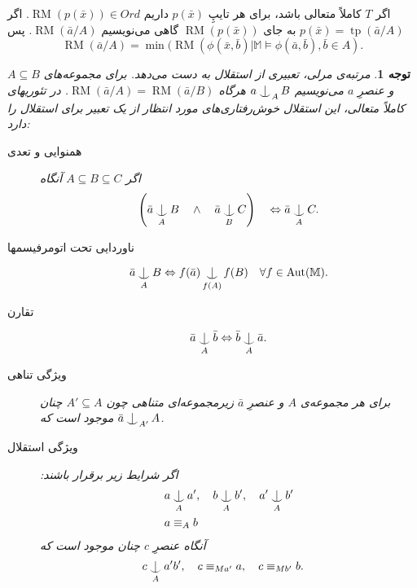 \documentclass[12pt,a4paper]{report}
\def\Ind#1#2{#1\setbox0=\hbox{$#1x$}\kern\wd0\hbox to 0pt{\hss$#1\mid$\hss}
\lower.9\ht0\hbox to 0pt{\hss$#1\smile$\hss}\kern\wd0}
\def\ind{\mathop{\mathpalette\Ind{}}}
\theoremstyle{colorhead}
\newtheorem{tav}[thm]{توجه}
\DeclareMathOperator{\RM}{RM}
\DeclareMathOperator{\tp}{tp}
\DeclareMathOperator{\Aut}{Aut}
\begin{document}
اگر 
$T$
کاملاً متعالی باشد، برای هر تایپِ
$p(\bar{x})$
داریم
$\RM(p(\bar{x}))\in Ord$.
اگر
\mbox{$p(\bar{x})=\tp(\bar{a}/A)$}
به جای
$\RM(p(\bar{x}))$
گاهی می‌نویسیم 
$\RM(\bar{a}/A)$.
پس
\[\RM(\bar{a}/A)=\min (\RM(\phi(\bar{x},\bar{b})|\mathbb{M}\models
\phi(\bar{a},\bar{b}),\bar{b}\in A).\]
\begin{framed}
\begin{tav}
مرتبه‌ی مرلی، تعبیری از استقلال به دست می‌دهد. برای مجموعه‌های
\mbox{$A\subseteq B$}
و
عنصرِ
$a$
می‌نویسیم
$a\ind_A B$
هرگاه
$\RM(\bar{a}/A)=\RM(\bar{a}/B)$.
در تئوریهای کاملاً متعالی، این استقلال خوش‌رفتاری‌های مورد انتظار از
یک تعبیر برای  استقلال را دارد:
\begin{description}
\item[همنوایی و تعدی]
اگر
$A\subseteq B\subseteq C$
آنگاه
\[
\left(\bar{a}\ind_A B \quad \wedge\quad   \bar{a}\ind_B C\right)\quad \Leftrightarrow
\bar{a}\ind_A C.
\]
\item[ناوردایی تحت اتومرفیسمها]
\[
\bar{a}\ind_A B\Leftrightarrow f(\bar{a})\ind_{f(A)}f(B) \quad \forall f\in \Aut(\mathbb{M}).
\]
\item[تقارن]
\[
\bar{a}\ind_A \bar{b}\Leftrightarrow \bar{b}\ind_A \bar{a}.
\]
\item[ویژگی تناهی]
برای هر مجموعه‌ی
$A$
و عنصرِ
$\bar{a}$
زیرمجموعه‌ای متناهی چون
$A'\subseteq A$
چنان موجود است که 
$\bar{a}\ind_{A'} A$.
\item[ویژگی استقلال]
اگر شرایط زیر برقرار باشند:
\begin{align*}
& a\ind_A a', \quad  b\ind_A b', \quad   a'\ind_A b'\\
& a\equiv_A b
\end{align*}
آنگاه عنصرِ
$c$
چنان موجود است که 
\begin{align*}
& c\ind_A a'b',\quad c\equiv_{Ma'}a, \quad c\equiv_{Mb'}b.
\end{align*}
\end{description}
\end{tav}
\end{framed}
\end{document}
